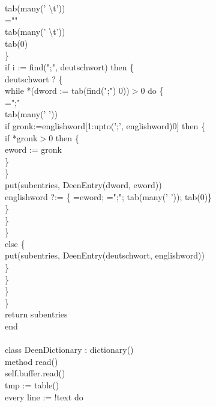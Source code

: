 {\>\>\>\>\>	       tab(many(' {\textbackslash}t')) \\
\>\>\>\>\>	       ="{\textbar}" \\
\>\>\>\>\>	       tab(many(' {\textbackslash}t')) \\
\>\>\>\>\>	       tab(0) \\
\>\>\>\>\>	       \} \\
\>\>\>\>	    if i := find(";", deutschwort) then \{ \\
\>\>\>\>\>	       deutschwort ? \{ \\
\>\>\>\>\>\>		  while *(dword := tab(find(";") {\textbar} 0))$>$0 do \{ \\
\>\>\>\>\>\>\>		     =";" \\
\>\>\>\>\>\>\>		     tab(many(' ')) \\
\>\>\>\>\>\>\>		     if gronk:=englishword[1:upto(';{\textbar}',
		     englishword){\textbar}0] then \{ \\
\>\>\>\>\>\>\>\>			if *gronk$>$0 then \{ \\
\>\>\>\>\>\>\>\>\>			   eword := gronk \\
\>\>\>\>\>\>\>\>\>			   \} \\
\>\>\>\>\>\>\>\>			\} \\
\>\>\>\>\>\>\>		     put(subentries, DeenEntry(dword, eword)) \\
\>\>\>\>\>\>\>		     englishword ?:= \{ =eword; =";"; tab(many(' '));
		     tab(0)\} \\
\>\>\>\>\>\>\>		     \} \\
\>\>\>\>\>\>		  \} \\
\>\>\>\>\>	       \} \\
\>\>\>\>	    else \{ \\
\>\>\>\>\>	       put(subentries, DeenEntry(deutschwort, englishword)) \\
\>\>\>\>\>	       \} \\
\>\>\>\>	    \} \\
\>\>\>	 \} \\
\>\>      \} \\
\>   return subentries \\
end \\
\ \\
class DeenDictionary : dictionary() \\
\>   method read() \\
\>\>      self.buffer.read() \\
\>\>      tmp := table() \\
\>\>      every line := !text do \\
}
